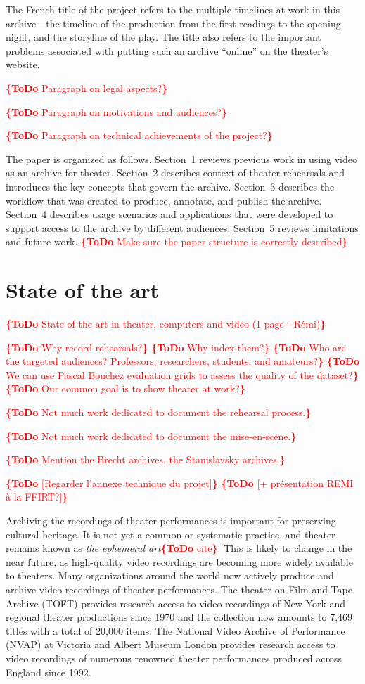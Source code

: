 \documentclass[conference]{IEEEtran}
\newcommand{\todo}[1]{\noindent\textcolor{red}{{\bf \{ToDo} #1{\bf \}}}}
\begin{document}
The French title of the project refers to the multiple timelines at work in this archive---the timeline of the production from the first readings to the opening night, and the storyline of the play. The title also refers to the important problems associated with putting such an archive ``online'' on the theater's website.

\todo{Paragraph on legal aspects?} 

\todo{Paragraph on motivations and audiences?} 

\todo{Paragraph on technical achievements of the project?}

The paper is organized as follows. Section~1 reviews previous work in using video as an archive for theater. Section~2 describes
context of theater rehearsals and introduces the key concepts that govern the archive. Section~3 describes the workflow that was
created to produce, annotate, and publish the archive. Section~4 describes usage scenarios and applications that were developed
to support access to the archive by different audiences. Section~5 reviews limitations and future work.
\todo{Make sure the paper structure is correctly described}


\section{State of the art}
\todo{State of the art in theater, computers and video (1 page - Rémi)}

\todo{Why record rehearsals?}
\todo{Why index them?}
\todo{Who are the targeted audiences? Professors, researchers, students, and amateurs?}
\todo{We can use Pascal Bouchez evaluation grids to assess the quality of the dataset?}
\todo{Our common goal is to show theater at work?}

\todo{Not much work dedicated to document the rehearsal process.}

\todo{Not much work dedicated to document the mise-en-scene.}

\todo{Mention the Brecht archives, the Stanislavsky archives.}

\todo{[Regarder l'annexe technique du projet]}
\todo{[+ présentation REMI à la FFIRT?]}

Archiving the recordings of theater performances is important for preserving  cultural heritage. 
It is not yet a common or systematic practice, and theater remains known as {\em the ephemeral art}\todo{cite}.
This is likely to change in the near future, as high-quality video recordings are becoming more widely
available to theaters.   Many organizations around the world now actively produce and
archive video recordings of theater performances. The theater on Film and Tape Archive
(TOFT) provides research access to video recordings of New York and regional theater productions
since 1970 and the collection now amounts to 7,469 titles with a total of 20,000 items. 
The National Video Archive of Performance (NVAP) at Victoria and Albert Museum London
provides research access to video recordings of numerous renowned theater performances produced
across England since 1992. 
\end{document}
